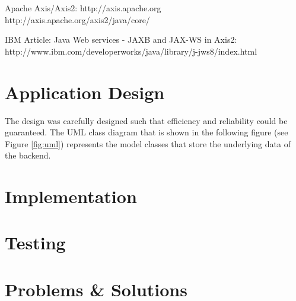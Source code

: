 \documentclass[11pt, a4paper]{article}
\begin{document}
Apache Axis/Axis2: http://axis.apache.org http://axis.apache.org/axis2/java/core/

IBM Article: Java Web services - JAXB and JAX-WS in Axis2:
http://www.ibm.com/developerworks/java/library/j-jws8/index.html

\section{Application Design}

The design was carefully designed such that efficiency and reliability could be
guaranteed. The UML class diagram that is shown in the following figure (see
Figure \ref{fig:uml}) represents the model classes that store the underlying
data of the backend. 


\section{Implementation}

\subsection{}

\section{Testing}
\section{Problems \& Solutions}

\nocite{*}


\end{document}
